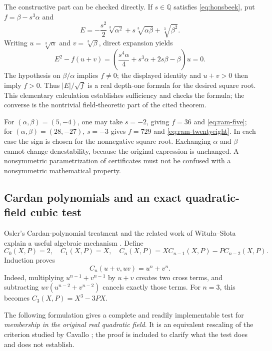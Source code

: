 \documentclass[11pt,a4paper]{article}
\numberwithin{equation}{section}
\theoremstyle{definition}\newtheorem{definition}[theorem]{Definition}
\theoremstyle{remark}\newtheorem{remark}[theorem]{Remark}
\newcommand{\Q}{\mathbb Q}\newcommand{\R}{\mathbb R}\newcommand{\C}{\mathbb C}\newcommand{\Z}{\mathbb Z}
\begin{document}
The constructive part can be checked directly. If $s\in\Q$ satisfies \eqref{eq:honsbeek}, put $f=\beta-s^3\alpha$ and
\[
E=-\frac{s^2}{2}\sqrt[3]{\alpha^2}
   +s\sqrt[3]{\alpha\beta}+\sqrt[3]{\beta^2}.
\]
Writing $u=\sqrt[3]\alpha$ and $v=\sqrt[3]\beta$, direct expansion yields
\[
E^2-f(u+v)
=\left(\frac{s^4\alpha}{4}+s^3\alpha+2s\beta-\beta\right)u=0.
\]
The hypothesis on $\beta/\alpha$ implies $f\ne0$; the displayed identity and $u+v>0$ then imply $f>0$. Thus $|E|/\sqrt f$ is a real depth-one formula for the desired square root. This elementary calculation establishes sufficiency and checks the formula; the converse is the nontrivial field-theoretic part of the cited theorem.

For $(\alpha,\beta)=(5,-4)$, one may take $s=-2$, giving $f=36$ and \eqref{eq:ram-five}; for $(\alpha,\beta)=(28,-27)$, $s=-3$ gives $f=729$ and \eqref{eq:ram-twentyeight}. In each case the sign is chosen for the nonnegative square root. Exchanging $\alpha$ and $\beta$ cannot change denestability, because the original expression is unchanged. A nonsymmetric parametrization of certificates must not be confused with a nonsymmetric mathematical property.

\subsection{Cardan polynomials and an exact quadratic-field cubic test}
Osler's Cardan-polynomial treatment and the related work of Witu\l a--S\l ota explain a useful algebraic mechanism \cite{osler,witula}. Define
\[
C_0(X,P)=2,\quad C_1(X,P)=X,\quad
C_n(X,P)=XC_{n-1}(X,P)-PC_{n-2}(X,P).
\]
Induction proves
\begin{equation}\label{eq:cardan}
C_n(u+v,uv)=u^n+v^n.
\end{equation}
Indeed, multiplying $u^{n-1}+v^{n-1}$ by $u+v$ creates two cross terms, and subtracting $uv(u^{n-2}+v^{n-2})$ cancels exactly those terms. For $n=3$, this becomes $C_3(X,P)=X^3-3PX$.

The following formulation gives a complete and readily implementable test for \emph{membership in the original real quadratic field}. It is an equivalent rescaling of the criterion studied by Cavallo \cite{cavallo}; the proof is included to clarify what the test does and does not establish.
\end{document}
